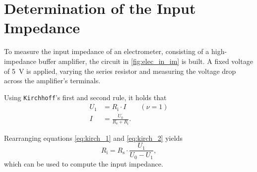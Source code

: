 \section{Determination of the Input Impedance}
To measure the input impedance of an electrometer, consisting of a high-impedance buffer amplifier, the circuit in \autoref{fig:elec_in_im} is built.
A fixed voltage of \SI{5}{\volt} is applied, varying the series resistor and measuring the voltage drop across the amplifier's terminals.

Using \texttt{Kirchhoff}'s first and second rule, it holds that
\begin{align}
	U_1	&= 	R_\text{i}\cdot I \label{eq:kirch_1}\qquad(\nu = 1)\\
	I 					&=	\frac{U_0}{R_\text{s}+R_\text{i}}.	\label{eq:kirch_2}
\end{align}

Rearranging equations \ref{eq:kirch_1} and \ref{eq:kirch_2} yields
\begin{equation}
	R_\text{i}=R_\text{s}\cdot\frac{U_1}{U_0-U_1},
\end{equation}
which can be used to compute the input impedance.
